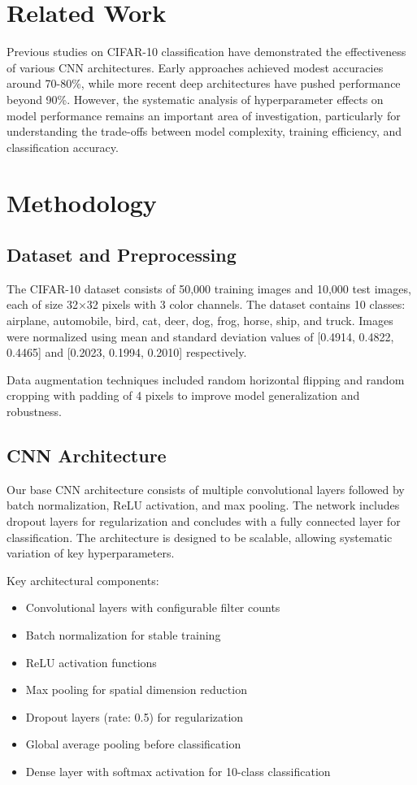 \documentclass[norunningheads]{llncs}
\begin{document}
\section{Related Work}

Previous studies on CIFAR-10 classification have demonstrated the effectiveness of various CNN architectures. Early approaches achieved modest accuracies around 70-80\%, while more recent deep architectures have pushed performance beyond 90\%. However, the systematic analysis of hyperparameter effects on model performance remains an important area of investigation, particularly for understanding the trade-offs between model complexity, training efficiency, and classification accuracy.

\section{Methodology}

\subsection{Dataset and Preprocessing}

The CIFAR-10 dataset consists of 50,000 training images and 10,000 test images, each of size 32×32 pixels with 3 color channels. The dataset contains 10 classes: airplane, automobile, bird, cat, deer, dog, frog, horse, ship, and truck. Images were normalized using mean and standard deviation values of [0.4914, 0.4822, 0.4465] and [0.2023, 0.1994, 0.2010] respectively.

Data augmentation techniques included random horizontal flipping and random cropping with padding of 4 pixels to improve model generalization and robustness.

\subsection{CNN Architecture}

Our base CNN architecture consists of multiple convolutional layers followed by batch normalization, ReLU activation, and max pooling. The network includes dropout layers for regularization and concludes with a fully connected layer for classification. The architecture is designed to be scalable, allowing systematic variation of key hyperparameters.

Key architectural components:
\begin{itemize}
\item Convolutional layers with configurable filter counts
\item Batch normalization for stable training
\item ReLU activation functions
\item Max pooling for spatial dimension reduction
\item Dropout layers (rate: 0.5) for regularization
\item Global average pooling before classification
\item Dense layer with softmax activation for 10-class classification
\end{itemize}
\end{document}
